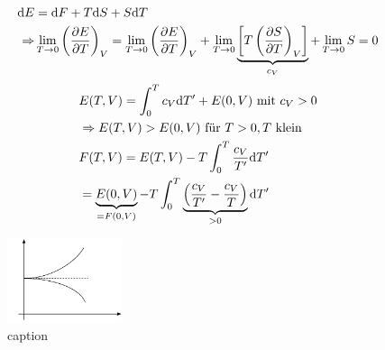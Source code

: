 \begin{enumerate}[i)]
\begin{itemize}
\begin{equation}
\begin{split}
                \mathrm{d} E &= \mathrm{d} F + T \mathrm{d} S + S \mathrm{d} T \\
                \Rightarrow & \lim_{T \to 0} \left( \frac{\partial E}{\partial T} \right)_{V} = \lim_{T \to 0} \left( \frac{\partial E}{\partial T} \right)_{V}
                + \lim_{T \to 0} \underbrace{\left[ T \left( \frac{\partial S}{\partial T} \right)_{V} \right]}_{c_V} + \lim_{T \to 0} S = 0
            \end{split}
        \end{equation}
        \begin{equation}
            \begin{split}
                & E(T, V) = \int_{0}^{T} c_V \mathrm{d} T' + E(0, V) \text{ mit } c_V > 0 \\
                &\Rightarrow E(T, V) > E(0, V) \text{ für } T > 0, T \text{ klein} \\
                & F(T, V) = E(T, V) - T \int_{0}^{T} \frac{c_V}{T'} \mathrm{d} T' \\
                & = \underbrace{E(0, V)}_{=F(0, V)} - T \int_{0}^{T} \underbrace{\left( \frac{c_V}{T'} - \frac{c_V}{T} \right)}_{>0} \mathrm{d} T'
            \end{split}
        \end{equation}
        \begin{figure}[H]
            \begin{center}
                \includegraphics[width=0.3\textwidth]{../img/FandEoverT.pdf}
                \caption{caption}  %
                \label{img:FandEoverT}
            \end{center}
        \end{figure}
    \end{itemize}
\end{enumerate}


